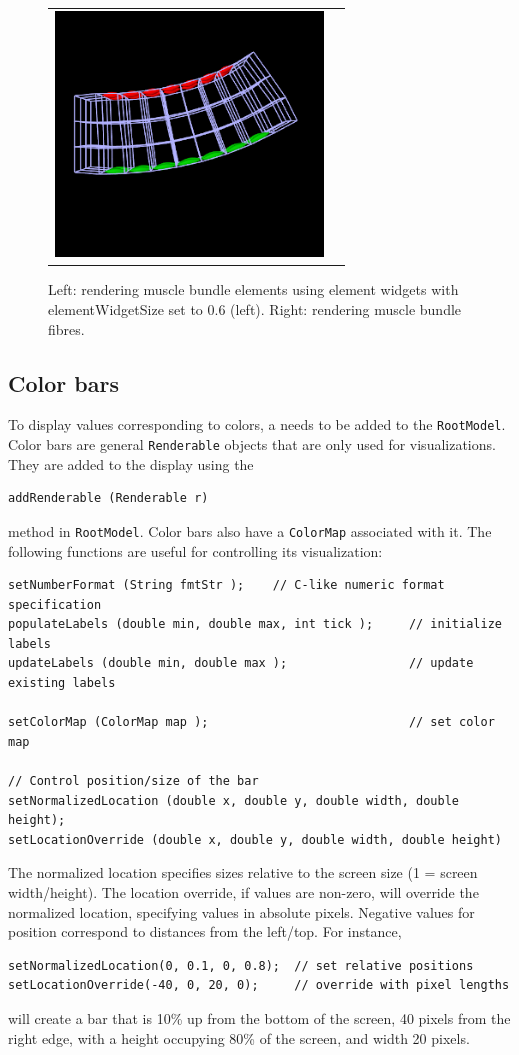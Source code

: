 \begin{figure}[h]
\begin{center}
\begin{tabular}{cc}
 \includegraphics[width=2.8in]{images/femMuscleFibreRender}
\fi
\end{tabular}
\end{center}
\caption{Left: rendering muscle bundle elements using element
widgets with {\sf elementWidgetSize} set to 0.6 (left).  Right:
rendering muscle bundle fibres.}
\label{FemMuscleRender2:fig} 
\end{figure}

\subsection{Color bars}

To display values corresponding to colors, a 
 needs to be added to the 
{\tt RootModel}.  Color bars are general {\tt Renderable} objects that are
only used for visualizations.  They are added to the display using the
\begin{lstlisting}[]
addRenderable (Renderable r)
\end{lstlisting}
method in {\tt RootModel}.  Color bars also have a {\tt ColorMap} associated
with it.  The following functions are useful for controlling its visualization:
\begin{lstlisting}[]
setNumberFormat (String fmtStr );    // C-like numeric format specification
populateLabels (double min, double max, int tick );     // initialize labels
updateLabels (double min, double max );                 // update existing labels

setColorMap (ColorMap map );                            // set color map

// Control position/size of the bar
setNormalizedLocation (double x, double y, double width, double height);
setLocationOverride (double x, double y, double width, double height)
\end{lstlisting}
The normalized location specifies sizes relative to the screen size 
(1 = screen width/height).  The location override, if values are non-zero,
will override the normalized location, specifying values in absolute pixels.
Negative values for position correspond to distances from the left/top.
For instance,
\begin{lstlisting}[]
setNormalizedLocation(0, 0.1, 0, 0.8);  // set relative positions
setLocationOverride(-40, 0, 20, 0);     // override with pixel lengths
\end{lstlisting}
will create a bar that is 10\% up from the bottom of the screen, 40 pixels from
the right edge, with a height occupying 80\% of the screen, and width 20 pixels.

